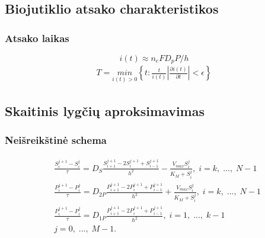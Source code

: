 \documentclass[12pt, a4paper, lithuanian]{article}
\begin{document}
\subsection{Biojutiklio atsako charakteristikos}
\subsubsection{Atsako laikas}
\begin{equation} 
    i(t) \approx n_eFD_pP/h 
\end{equation}
\begin{equation} 
\begin{aligned}
    T = \underset{i(t)>0}{min}\left\{t:\frac{t}{i(t)} \left| \frac{\partial i(t)}{\partial t}
    \right| < \epsilon \right\}
\end{aligned}
\end{equation}
 
\subsection{Skaitinis lygčių aproksimavimas}
\subsubsection{Neišreikštinė schema}

\begin{equation}
\begin{aligned} 
    &\frac{S_i^{j+1} - S_i^j}{\tau} = D_S\frac{S_{i+1}^{j+1} -
    2S_i^{j+1} + S_{i-1}^{j+1}}{h^2} -
    \frac{V_{max} S_i^j}{K_M + S_i^j},\;i = k,\;...,\;N-1\\ 
    &\frac{P_i^{j+1} - P_i^j}{\tau} = D_{2P}\frac{P_{i+1}^{j+1} -
    2P_i^{j+1} + P_{i-1}^{j+1}}{h^2} +
    \frac{V_{max} S_i^j}{K_M + S_i^j},\;i = k,\;...,\;N-1\\ 
    &\frac{P_i^{j+1} - P_i^j}{\tau} = D_{1P}\frac{P_{i+1}^{j+1} -
    2P_i^{j+1} + P_{i-1}^{j+1}}{h^2}, \;i = 1,\;...,\;k-1\\ 
    &j=0,\;...,\;M-1.
\end{aligned}
\end{equation}
\end{document}

